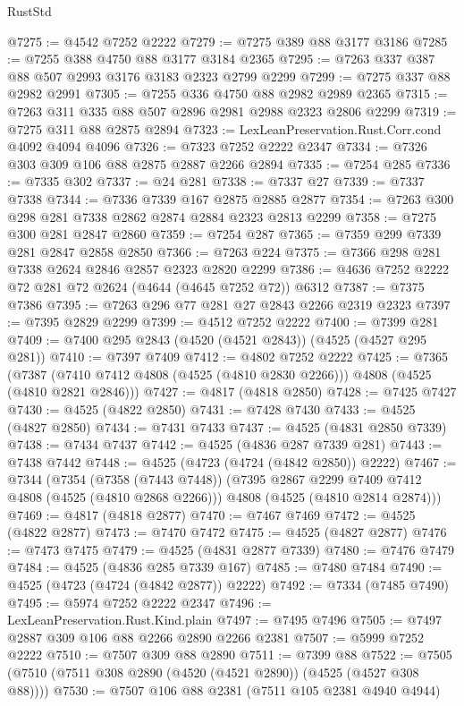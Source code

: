 \begin{lexlean}{RustStd}
\begin{coremodule}
{\begin{coremodule}
{{{{{{{{{{{{{{@7275 := @4542 @7252 @2222
@7279 := @7275 @389 @88 @3177 @3186
@7285 := @7255 @388 @4750 @88 @3177 @3184 @2365
@7295 := @7263 @337 @387 @88 @507 @2993 @3176 @3183 @2323 @2799 @2299
@7299 := @7275 @337 @88 @2982 @2991
@7305 := @7255 @336 @4750 @88 @2982 @2989 @2365
@7315 := @7263 @311 @335 @88 @507 @2896 @2981 @2988 @2323 @2806 @2299
@7319 := @7275 @311 @88 @2875 @2894
@7323 := LexLeanPreservation.Rust.Corr.cond @4092 @4094 @4096
@7326 := @7323 @7252 @2222 @2347
@7334 := @7326 @303 @309 @106 @88 @2875 @2887 @2266 @2894
@7335 := @7254 @285
@7336 := @7335 @302
@7337 := @24 @281
@7338 := @7337 @27
@7339 := @7337 @7338
@7344 := @7336 @7339 @167 @2875 @2885 @2877
@7354 := @7263 @300 @298 @281 @7338 @2862 @2874 @2884 @2323 @2813 @2299
@7358 := @7275 @300 @281 @2847 @2860
@7359 := @7254 @287
@7365 := @7359 @299 @7339 @281 @2847 @2858 @2850
@7366 := @7263 @224
@7375 := @7366 @298 @281 @7338 @2624 @2846 @2857 @2323 @2820 @2299
@7386 := @4636 @7252 @2222 @72 @281 @72 @2624 (@4644 (@4645 @7252 @72)) @6312
@7387 := @7375 @7386
@7395 := @7263 @296 @77 @281 @27 @2843 @2266 @2319 @2323
@7397 := @7395 @2829 @2299
@7399 := @4512 @7252 @2222
@7400 := @7399 @281
@7409 := @7400 @295 @2843 (@4520 (@4521 @2843)) (@4525 (@4527 @295 @281))
@7410 := @7397 @7409
@7412 := @4802 @7252 @2222
@7425 := @7365
    (@7387 (@7410 @7412 @4808 (@4525 (@4810 @2830 @2266))) @4808 (@4525 (@4810 @2821 @2846)))
@7427 := @4817 (@4818 @2850)
@7428 := @7425 @7427
@7430 := @4525 (@4822 @2850)
@7431 := @7428 @7430
@7433 := @4525 (@4827 @2850)
@7434 := @7431 @7433
@7437 := @4525 (@4831 @2850 @7339)
@7438 := @7434 @7437
@7442 := @4525 (@4836 @287 @7339 @281)
@7443 := @7438 @7442
@7448 := @4525 (@4723 (@4724 (@4842 @2850)) @2222)
@7467 := @7344
    (@7354
      (@7358 (@7443 @7448))
      (@7395 @2867 @2299 @7409 @7412 @4808 (@4525 (@4810 @2868 @2266)))
      @4808
      (@4525 (@4810 @2814 @2874)))
@7469 := @4817 (@4818 @2877)
@7470 := @7467 @7469
@7472 := @4525 (@4822 @2877)
@7473 := @7470 @7472
@7475 := @4525 (@4827 @2877)
@7476 := @7473 @7475
@7479 := @4525 (@4831 @2877 @7339)
@7480 := @7476 @7479
@7484 := @4525 (@4836 @285 @7339 @167)
@7485 := @7480 @7484
@7490 := @4525 (@4723 (@4724 (@4842 @2877)) @2222)
@7492 := @7334 (@7485 @7490)
@7495 := @5974 @7252 @2222 @2347
@7496 := LexLeanPreservation.Rust.Kind.plain
@7497 := @7495 @7496
@7505 := @7497 @2887 @309 @106 @88 @2266 @2890 @2266 @2381
@7507 := @5999 @7252 @2222
@7510 := @7507 @309 @88 @2890
@7511 := @7399 @88
@7522 := @7505 (@7510 (@7511 @308 @2890 (@4520 (@4521 @2890)) (@4525 (@4527 @308 @88))))
@7530 := @7507 @106 @88 @2381 (@7511 @105 @2381 @4940 @4944)
}}}}}}}}}}}}}}
\end{coremodule}}
\end{coremodule}
\end{lexlean}
